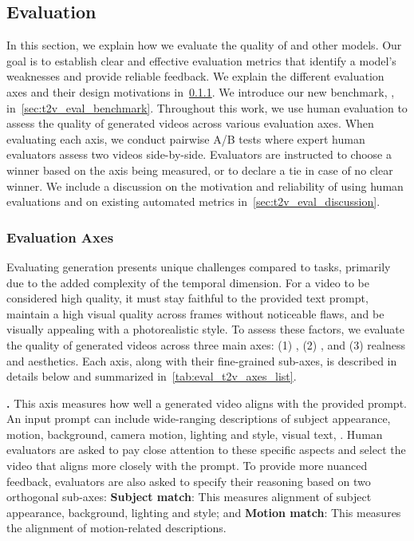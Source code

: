\subsection{Evaluation} \label{T2V_model_evaluation}
In this section, we explain how we evaluate the \textToV quality of \OursVideo and other models.
Our goal is to establish clear and effective evaluation metrics that identify a model's weaknesses and provide reliable feedback.
We explain the different \textToV evaluation axes and their design motivations in~\cref{sec:T2V_evaluation_axes}.
We introduce our new benchmark, \textToVBenchmarkName, in~\cref{sec:t2v_eval_benchmark}.
Throughout this work, we use human evaluation to assess the quality of generated videos across various evaluation axes.
When evaluating each axis, we conduct pairwise A/B tests where expert human evaluators assess two videos side-by-side.
Evaluators are instructed to choose a winner based on the axis being measured, or to declare a tie in case of no clear winner.
We include a discussion on the motivation and reliability of using human evaluations and on existing automated metrics in~\cref{sec:t2v_eval_discussion}.

\subsubsection{Evaluation Axes} \label{sec:T2V_evaluation_axes}

Evaluating \textToV generation presents unique challenges compared to \textToI tasks, primarily due to the added complexity of the temporal dimension.
For a video to be considered high quality, it must stay faithful to the provided text prompt, maintain a high visual quality across frames without noticeable flaws, and be visually appealing with a photorealistic style.
To assess these factors, we evaluate the quality of generated videos across three main axes: (1) \faithfulnessFull, (2) \qualityFull, and (3) realness and aesthetics. Each axis, along with their fine-grained sub-axes, is described in details below and summarized in~\cref{tab:eval_t2v_axes_list}.



\noindent \textbf{\faithfulnessFull.}
This axis measures how well a generated video aligns with the provided prompt.
An input prompt can include wide-ranging descriptions of subject appearance, motion, background, camera motion, lighting and style, visual text, \etc.
Human evaluators are asked to pay close attention to these specific aspects and select the video that aligns more closely with the prompt.
To provide more nuanced feedback, evaluators are also asked to specify their reasoning based on two orthogonal sub-axes: \textbf{Subject match}: This measures alignment of subject appearance, background, lighting and style; and \textbf{Motion match}: This measures the alignment of motion-related descriptions.

